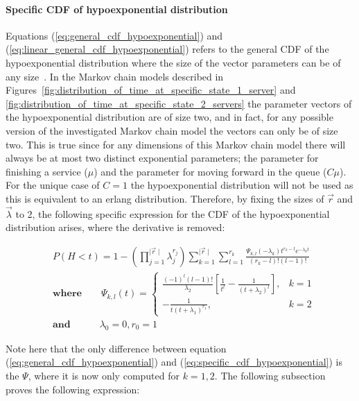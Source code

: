\paragraph{Specific CDF of hypoexponential distribution}
Equations (\ref{eq:general_cdf_hypoexponential}) and
(\ref{eq:linear_general_cdf_hypoexponential}) refers to the general CDF of the
hypoexponential distribution where the size of the vector parameters can be of
any size~\cite{Favaro2010}.
In the Markov chain models described in
Figures~\ref{fig:distribution_of_time_at_specific_state_1_server} and
\ref{fig:distribution_of_time_at_specific_state_2_servers} the parameter vectors
of the hypoexponential distribution are of size two, and in fact, for any
possible version of the investigated Markov chain model the vectors can only be
of size two.
This is true since for any dimensions of this Markov chain model there will
always be at most two distinct exponential parameters; the parameter for
finishing a service (\(\mu\)) and the parameter for moving forward in the queue
(\(C \mu\)).
For the unique case of \(C=1\) the hypoexponential distribution will not be
used as this is equivalent to an erlang distribution.
Therefore, by fixing the sizes of \(\vec{r}\) and \(\vec{\lambda}\) to 2, the
following specific expression for the CDF of the hypoexponential distribution
arises, where the derivative is removed:


\begin{align} \label{eq:specific_cdf_hypoexponential}
    & P(H < t) = 1 - \left( \prod_{j=1}^{\mid \vec{r} \mid} \lambda_j^{r_j}
    \right) \sum_{k=1}^{\mid \vec{r} \mid} \sum_{l=1}^{r_k}
    \frac{\Psi_{k,l}(-\lambda_k)t^{r_k - l} e^{-\lambda_k t}}{(r_k - l)!
    (l - 1)!} \nonumber \\
    & \textbf{where} \qquad \Psi_{k,l}(t) =
    \begin{cases}
        \frac{(-1)^{l} (l-1)!}{\lambda_2} \left[\frac{1}{t^l} - \frac{1}
        {(t + \lambda_2)^l}\right] , & k=1 \\
        - \frac{1}{t (t + \lambda_1)^{r_1}}, & k=2
    \end{cases} \nonumber \\
    & \textbf{and} \quad \qquad \lambda_0 = 0, r_0 = 1
\end{align}

Note here that the only difference between equation
(\ref{eq:general_cdf_hypoexponential}) and
(\ref{eq:specific_cdf_hypoexponential}) is the \(\Psi\), where it is now only
computed for \(k=1,2\).
The following subsection proves the following expression:

